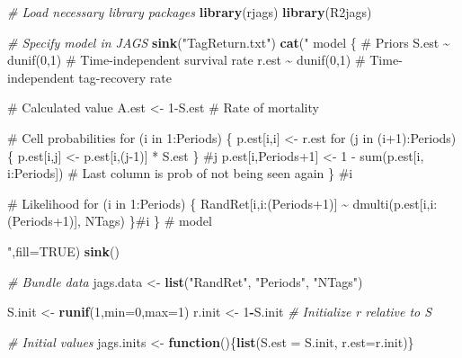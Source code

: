 \documentclass[
]{krantz}
\makeatletter
\newenvironment{Shaded}{\begin{snugshade}}{\end{snugshade}}
\newcommand{\AttributeTok}[1]{\textcolor[rgb]{0.27,0.27,0.27}{#1}}
\newcommand{\CommentTok}[1]{\textcolor[rgb]{0.37,0.37,0.37}{\textit{#1}}}
\newcommand{\ConstantTok}[1]{\textcolor[rgb]{0.37,0.37,0.37}{#1}}
\newcommand{\ControlFlowTok}[1]{\textcolor[rgb]{0.27,0.27,0.27}{\textbf{#1}}}
\newcommand{\DecValTok}[1]{\textcolor[rgb]{0.06,0.06,0.06}{#1}}
\newcommand{\FunctionTok}[1]{\textcolor[rgb]{0.27,0.27,0.27}{\textbf{#1}}}
\newcommand{\NormalTok}[1]{#1}
\newcommand{\OtherTok}[1]{\textcolor[rgb]{0.37,0.37,0.37}{#1}}
\newcommand{\SpecialCharTok}[1]{\textcolor[rgb]{0.43,0.43,0.43}{\textbf{#1}}}
\newcommand{\StringTok}[1]{\textcolor[rgb]{0.5,0.5,0.5}{#1}}
\newenvironment{kframe}{%
\medskip{}
\setlength{\fboxsep}{.8em}
 \def\at@end@of@kframe{}%
 \ifinner\ifhmode%
  \def\at@end@of@kframe{\end{minipage}}%
  \begin{minipage}{\columnwidth}%
 \fi\fi%
 \def\FrameCommand##1{\hskip\@totalleftmargin \hskip-\fboxsep
 \colorbox{shadecolor}{##1}\hskip-\fboxsep
     \hskip-\linewidth \hskip-\@totalleftmargin \hskip\columnwidth}%
 \MakeFramed {\advance\hsize-\width
   \@totalleftmargin\z@ \linewidth\hsize
   \@setminipage}}%
 {\par\unskip\endMakeFramed%
 \at@end@of@kframe}
\renewenvironment{Shaded}{\begin{kframe}}{\end{kframe}}
\makeatother
\begin{document}
\begin{Shaded}
\begin{Highlighting}[]
\CommentTok{\# Load necessary library packages}
\FunctionTok{library}\NormalTok{(rjags)}
\FunctionTok{library}\NormalTok{(R2jags)}

\CommentTok{\# Specify model in JAGS}
\FunctionTok{sink}\NormalTok{(}\StringTok{"TagReturn.txt"}\NormalTok{)}
\FunctionTok{cat}\NormalTok{(}\StringTok{"}
\StringTok{model \{}
\StringTok{  \# Priors}
\StringTok{  S.est \textasciitilde{} dunif(0,1) \# Time{-}independent survival rate}
\StringTok{  r.est \textasciitilde{} dunif(0,1) \# Time{-}independent tag{-}recovery rate}

\StringTok{  \# Calculated value}
\StringTok{  A.est \textless{}{-} 1{-}S.est \# Rate of mortality}

\StringTok{\# Cell probabilities}
\StringTok{for (i in 1:Periods) \{}
\StringTok{   p.est[i,i] \textless{}{-} r.est}
\StringTok{   for (j in (i+1):Periods) \{}
\StringTok{      p.est[i,j] \textless{}{-} p.est[i,(j{-}1)] * S.est}
\StringTok{      \} \#j}
\StringTok{    p.est[i,Periods+1] \textless{}{-} 1 {-} sum(p.est[i, i:Periods])}
\StringTok{    \# Last column is prob of not being seen again}
\StringTok{    \} \#i}

\StringTok{\# Likelihood}
\StringTok{  for (i in 1:Periods) \{}
\StringTok{    RandRet[i,i:(Periods+1)] \textasciitilde{} dmulti(p.est[i,i:(Periods+1)], NTags)}
\StringTok{    \}\#i}
\StringTok{ \} \# model}

\StringTok{"}\NormalTok{,}\AttributeTok{fill=}\ConstantTok{TRUE}\NormalTok{)}
\FunctionTok{sink}\NormalTok{()}

     \CommentTok{\# Bundle data}
\NormalTok{  jags.data }\OtherTok{\textless{}{-}} \FunctionTok{list}\NormalTok{(}\StringTok{"RandRet"}\NormalTok{, }\StringTok{"Periods"}\NormalTok{, }\StringTok{"NTags"}\NormalTok{)}

\NormalTok{  S.init }\OtherTok{\textless{}{-}} \FunctionTok{runif}\NormalTok{(}\DecValTok{1}\NormalTok{,}\AttributeTok{min=}\DecValTok{0}\NormalTok{,}\AttributeTok{max=}\DecValTok{1}\NormalTok{)}
\NormalTok{  r.init }\OtherTok{\textless{}{-}} \DecValTok{1}\SpecialCharTok{{-}}\NormalTok{S.init  }\CommentTok{\# Initialize r relative to S}

  \CommentTok{\# Initial values}
\NormalTok{  jags.inits }\OtherTok{\textless{}{-}} \ControlFlowTok{function}\NormalTok{()\{}\FunctionTok{list}\NormalTok{(}\AttributeTok{S.est =}\NormalTok{ S.init, }\AttributeTok{r.est=}\NormalTok{r.init)\}}


\end{Highlighting}
\end{Shaded}
\end{document}
